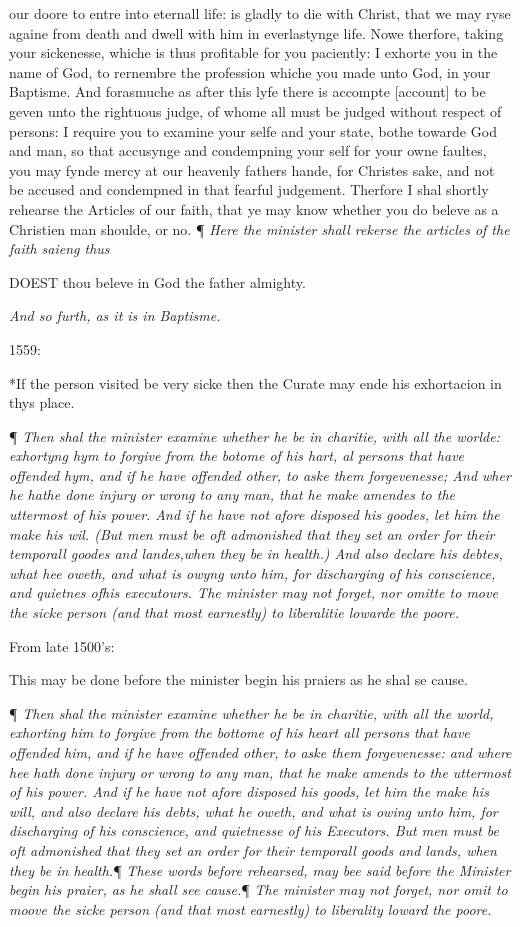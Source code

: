 our doore to entre into eternall life: is gladly to die with Christ, that
we may ryse againe from death and dwell with him in everlastynge life.
Nowe therfore, taking your sickenesse, whiche is thus profitable for you
paciently: I exhorte you in the name of God, to rernembre the profession
whiche you made unto God, in your Baptisme. And forasmuche as after this
lyfe there is accompte [account]
to be geven unto the rightuous judge, of whome all must be judged without
respect of persons: I require you to examine your selfe and your state,
bothe towarde God and man, so that accusynge and condempning your self
for your owne faultes, you may fynde mercy at our heavenly fathers hande,
for Christes sake, and not be accused and condempned in that fearful judgement.
Therfore I shal shortly rehearse the Articles of our faith, that ye may
know whether you do beleve as a Christien man shoulde, or no.
¶
\emph{Here the minister shall rekerse the articles of the faith saieng thus}

DOEST
thou beleve in God the father almighty.

\emph{And
so furth, as it is in Baptisme.}

1559:

*If
the person visited be very sicke then the Curate may ende his exhortacion
in thys place.

¶ \emph{Then
shal the minister examine whether he be in charitie, with all the worlde:
exhortyng hym to forgive from the botome of his hart, al persons that
have offended hym, and if he have offended other, to aske them forgevenesse;
And wher he hathe done injury or wrong to any man, that he make amendes
to the uttermost of his power. And if he have not afore disposed his goodes,
let him the make his wil. (But men must be oft admonished that they set
an order for their temporall goodes and landes,when they be in health.)
And also declare his debtes, what hee oweth, and what is owyng unto him,
for discharging of his conscience, and quietnes ofhis executours. The
minister may not forget, nor omitte to move the sicke person (and that
most earnestly) to liberalitie lowarde the poore.}

From
late 1500's:

This may
be done before the minister begin his praiers as he shal se cause.

¶ \emph{Then shal the minister examine whether he be in charitie, with
all the world, exhorting him to forgive from the bottome of his heart
all persons that have offended him, and if he have offended other, to
aske them forgevenesse: and where hee hath done injury or wrong to any
man, that he make amends to the uttermost of his power. And if he have
not afore disposed his goods, let him the make his will, and also declare
his debts, what he oweth, and what is owing unto him, for discharging
of his conscience, and quietnesse of his Executors. But men must be oft
admonished that they set an order for their temporall goods and lands,
when they be in health.}¶ \emph{These words before rehearsed, may bee
said before the Minister begin his praier, as he shall see cause.}\emph{}¶ \emph{The minister may not forget, nor omit to
moove the sicke person (and that most earnestly) to liberality loward
the poore.}

